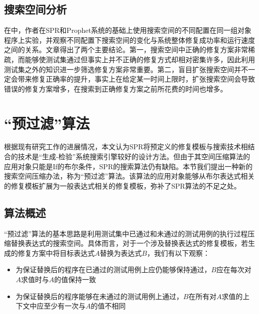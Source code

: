 \subsection{搜索空间分析}

在\cite{spr_searchspace}中，作者在SPR和Prophet系统的基础上使用搜索空间的不同配置在同一组对象程序上实验，并观察不同配置下搜索空间的变化与系统整体修复成功率和运行速度之间的关系。文章得出了两个主要结论。第一，搜索空间中正确的修复方案非常稀疏，而能够使测试集通过但事实上并不正确的修复方式却相对密集许多，因此利用测试集之外的知识进一步筛选修复方案非常重要。第二，盲目扩张搜索空间并不一定会带来修复正确率的提升，事实上在给定某一时间上限时，扩张搜索空间会导致错误的修复方案增多，在搜索到正确修复方案之前所花费的时间也增多。

\section{“预过滤”算法}%

根据现有研究工作的进展情况，本文认为SPR将预定义的修复模板与搜索技术相结合的技术是“生成-检验”系统搜索引擎较好的设计方法。但由于其空间压缩算法的应用对象只能是If的布尔条件，SPR的搜索算法仍有缺陷。本节我们提出一种新的搜索空间压缩办法，称为“预过滤”算法。该算法的应用对象能够从布尔表达式相关的修复模板扩展为一般表达式相关的修复模板，弥补了SPR算法的不足之处。

\subsection{算法概述}
“预过滤”算法的基本思路是利用测试集中已通过和未通过的测试用例的执行过程压缩替换表达式的搜索空间。具体而言，对于一个涉及替换表达式的修复模板，若生成的修复方案中将目标表达式$A$替换为表达式$B$，我们有以下观察：
\begin{itemize}
	\item 为保证替换后的程序在已通过的测试用例上应仍能够保持通过，$B$应在每次对$A$求值时与$A$的值保持一致
	\item 为保证替换后的程序能够在未通过的测试用例上通过，$B$在所有对$A$求值的上下文中应至少有一次与$A$的值不相同
\end{itemize}

